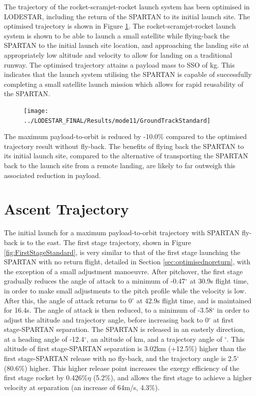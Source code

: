 The trajectory of the rocket-scramjet-rocket launch system has been optimised in LODESTAR, including the return of the SPARTAN to its initial launch site. The optimised trajectory is shown in Figure \ref{fig:GroundTrackStandard}. 
The rocket-scramjet-rocket launch system is shown to be able to launch a small satellite 
while flying-back the SPARTAN to the initial launch site location, and approaching the landing site at appropriately low altitude and velocity to allow for landing on a traditional runway. 
The optimised trajectory attains a payload mass to SSO of \PayloadToOrbitStandard kg. 
This indicates that the launch system utilising the SPARTAN is capable of successfully completing a small satellite launch mission which allows for rapid reusability of the SPARTAN. 
\begin{figure}[ht!]
	\centering
	\texttt{[image: ../LODESTAR\_FINAL/Results/mode11/GroundTrackStandard]}
	\caption{}
	\label{fig:GroundTrackStandard}
\end{figure}
The maximum payload-to-orbit is reduced by -10.0\% compared to the optimised trajectory result without fly-back. The benefits of flying back the SPARTAN to its initial launch site, compared to the alternative of transporting the SPARTAN back to the launch site from a remote landing, are likely to far outweigh this associated reduction in payload. 



\section{Ascent Trajectory}

 The initial launch for a maximum payload-to-orbit trajectory with SPARTAN fly-back is to the east.
 The first stage trajectory, shown in Figure \ref{fig:FirstStageStandard}, is very similar to that of the first stage launching the SPARTAN with no return flight, detailed in Section \ref{sec:optimisednoreturn}, with the exception of a small adjustment manoeuvre. 
 After pitchover, the first stage gradually reduces the angle of attack to a minimum of -0.47$^\circ$ at 30.9s flight time, in order to make small adjustments to the pitch profile while the velocity is low. After this, the angle of attack returns to 0$^\circ$ at 42.9s flight time, and is maintained for 16.4s.
 The angle of attack is then reduced, to a minimum of -3.58$^\circ$ in order to adjust the altitude and trajectory angle, before increasing back to 0$^\circ$ at first stage-SPARTAN separation. 
 The SPARTAN is released in an easterly direction, at a heading angle of -12.4$^\circ$, an altitude of \firstsecondSeparationAltStandard km, and a trajectory angle of \firstsecondSeparationgammaStandard $^\circ$. 
 This altitude of first stage-SPARTAN separation is 3.02km (+12.5\%) higher than the first stage-SPARTAN release with no fly-back, and the trajectory angle is 2.5$^\circ$ (80.6\%) higher. 
 This higher release point increases the exergy efficiency of the first stage rocket by 0.426\%$\eta$ (5.2\%), and allows the first stage to achieve a higher velocity at separation (an increase of 64m/s, 4.3\%). 
 
